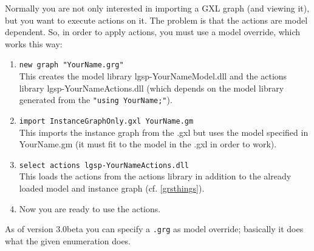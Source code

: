 \begin{note}\label{shellgxlimport}
Normally you are not only interested in importing a GXL graph (and viewing it), but you want to execute actions on it.
The problem is that the actions are model dependent.
So, in order to apply actions, you must use a model override, which works this way:
\begin{enumerate}
\item \texttt{new graph "YourName.grg"}\\
This creates the model library lgsp-YourNameModel.dll
and the actions library lgsp-YourNameActions.dll
(which depends on the model library generated from the \texttt{"using YourName;"}).
\item \texttt{import InstanceGraphOnly.gxl YourName.gm}\\
This imports the instance graph from the .gxl but uses the model specified
in YourName.gm (it must fit to the model in the .gxl in order to work).
\item \texttt{select actions lgsp-YourNameActions.dll}\\
This loads the actions from the actions library in addition to the already
loaded model and instance graph (cf. \ref{grsthings}).
\item Now you are ready to use the actions.
\end{enumerate}
As of version 3.0beta you can specify a \texttt{.grg} as model override;
basically it does what the given enumeration does.
\end{note}

